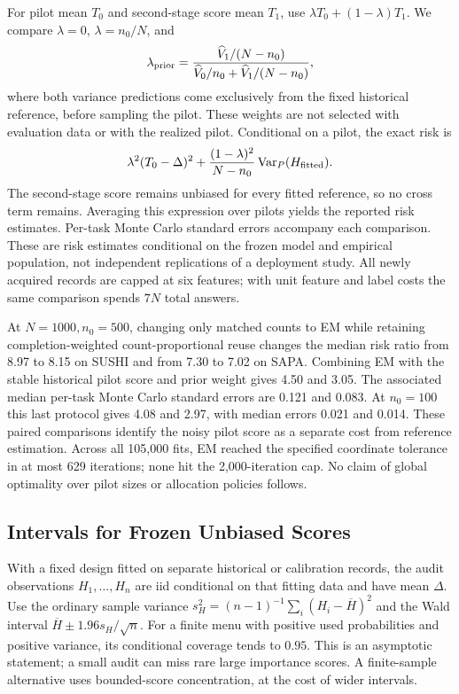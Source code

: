 For pilot mean $T_0$ and second-stage score mean $T_1$, use
$\lambda T_0+(1-\lambda)T_1$. We compare $\lambda=0$, $\lambda=n_0/N$, and
\[
 \lambda_{\rm prior}=
 \frac{\widehat V_1/(N-n_0)}{\widehat V_0/n_0+\widehat V_1/(N-n_0)},
\]
where both variance predictions come exclusively from the fixed historical
reference, before sampling the pilot. These weights are not selected with
evaluation data or with the realized pilot. Conditional on a pilot, the
exact risk is
\[
 \lambda^2(T_0-\Delta)^2+
       \frac{(1-\lambda)^2}{N-n_0}\operatorname{Var}_P(H_{\rm fitted}).
\]
The second-stage score remains unbiased for every fitted reference, so no
cross term remains. Averaging this expression over pilots yields the
reported risk estimates. Per-task Monte Carlo standard errors accompany
each comparison. These are risk estimates conditional on the frozen model
and empirical population, not independent replications of a deployment
study. All newly acquired records are capped at six features; with unit
feature and label costs the same comparison spends $7N$ total answers.



At $N=1000,n_0=500$, changing only matched counts to EM while retaining
completion-weighted count-proportional reuse changes the median risk ratio
from 8.97 to 8.15 on SUSHI and from 7.30 to 7.02 on SAPA. Combining EM
with the stable historical pilot score and prior weight gives 4.50 and
3.05. The associated median per-task Monte Carlo standard errors are
0.121 and 0.083. At $n_0=100$ this last protocol gives 4.08 and 2.97, with
median errors 0.021 and 0.014. These paired comparisons identify the noisy
pilot score as a separate cost from reference estimation. Across all
105,000 fits, EM reached the specified coordinate tolerance in at most
629 iterations; none hit the 2,000-iteration cap. No claim of global
optimality over pilot sizes or allocation policies follows.

\subsection{Intervals for Frozen Unbiased Scores}\label{app:coverage}
With a fixed design fitted on separate historical or calibration records,
the audit observations $H_1,\ldots,H_n$ are iid conditional on that fitting
data and have mean $\Delta$. Use the ordinary sample variance
$s_H^2=(n-1)^{-1}\sum_i(H_i-\overline H)^2$ and the Wald interval
$\overline H\pm1.96s_H/\sqrt n$. For a finite menu with positive used
probabilities and positive variance, its conditional coverage tends to
$0.95$. This is an asymptotic statement; a small audit can miss rare large
importance scores. A finite-sample alternative uses bounded-score
concentration, at the cost of wider intervals.

